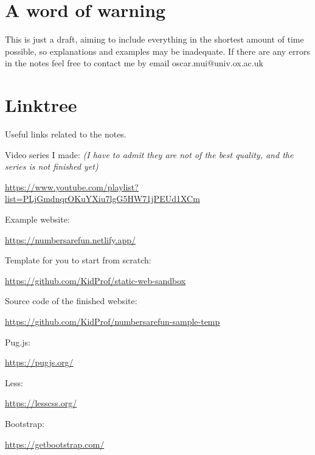 \section{A word of warning}

This is just a draft, aiming to include everything in the shortest amount of time possible, so explanations and examples may be inadequate. If there are any errors in the notes feel free to contact me by email oscar.mui@univ.ox.ac.uk

\section{Linktree}

Useful links related to the notes.
\vspace{6mm}

Video series I made: \textit{(I have to admit they are not of the best quality, and the series is not finished yet)}

\url{https://www.youtube.com/playlist?list=PLjGmdnqrOKuYXiu7lgG5HW71jPEUd1XCm}
\vspace{6mm}

Example website:

\url{https://numbersarefun.netlify.app/}
\vspace{6mm}

Template for you to start from scratch:

\url{https://github.com/KidProf/static-web-sandbox}
\vspace{6mm}

Source code of the finished website:

\url{https://github.com/KidProf/numbersarefun-sample-temp}
\vspace{6mm}

Pug.js: 

\url{https://pugjs.org/}
\vspace{6mm}

Less: 

\url{https://lesscss.org/}
\vspace{6mm}

Bootstrap: 

\url{https://getbootstrap.com/}
\vspace{6mm}


